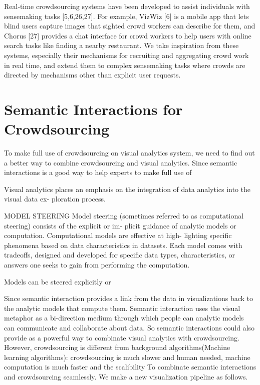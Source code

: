 \documentclass[journal]{vgtc}                %
\begin{document}
Real-time crowdsourcing systems have been developed to assist individuals with sensemaking tasks [5,6,26,27]. For example, VizWiz [6] is a mobile app that lets blind users capture images that sighted crowd workers can describe for them, and Chorus [27] provides a chat interface for crowd workers to help users with online search tasks like finding a nearby restaurant. We take inspiration from these systems, especially their mechanisms for recruiting and aggregating crowd work in real time, and extend them to complex sensemaking tasks where crowds are directed by mechanisms other than explicit user requests.



\section{Semantic Interactions for Crowdsourcing}

To make full use of crowdsourcing on visual analytics system, we need to find out a better way to combine crowdsourcing and visual analytics. 
Since semantic interactions is a good way to help experts to make full use of 

Visual analytics places an emphasis on the integration of data analytics into the visual data ex- ploration process.


MODEL STEERING
Model steering (sometimes referred to as computational steering) consists of the explicit or im- plicit guidance of analytic models or computation. Computational models are eﬀective at high- lighting speciﬁc phenomena based on data characteristics in datasets. Each model comes with tradeoﬀs, designed and developed for speciﬁc data types, characteristics, or answers one seeks to gain from performing the computation.

Models can be steered explicitly or 


Since semantic interaction provides a link from the data in visualizations back to the analytic models that compute them. 
Semantic interaction uses the visual metaphor as a bi-direction medium through which people can analytic models can communicate and collaborate about data.
So semantic interactions could also provide as a powerful way to combinate visual analytics with crowdsourcing. 
However, crowdsourcing is different from background algorithms(Machine learning algorithms): crowdsourcing is much slower and human needed, machine computation is much faster and the scalibility
To combinate semantic interactions and crowdsourcing seamlessly. We make a new visualization pipeline as follows.
\end{document}
